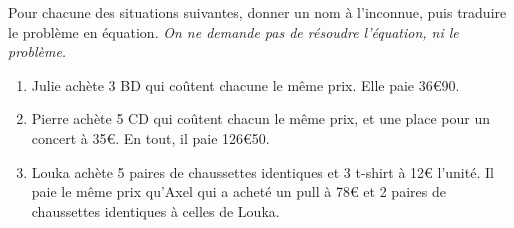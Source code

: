 \begin{minipage}{0.99\linewidth}

\exo


Pour chacune des situations suivantes, donner un nom à l'inconnue, puis traduire le problème en équation. \emph{On ne demande pas de résoudre l'équation, ni le problème.}

\begin{enumerate}
\item Julie achète 3 BD qui coûtent chacune le même prix. Elle paie 36€90.

\item Pierre achète 5 CD qui coûtent chacun le même prix, et une place pour un concert à 35€. En tout, il paie 126€50.

\item Louka achète 5 paires de chaussettes identiques et 3 t-shirt à 12€ l'unité. Il paie le même prix qu'Axel qui a acheté un pull à 78€ et 2 paires de chaussettes identiques à celles de Louka.

\end{enumerate}

\end{minipage}

\vspace{0.5cm}
